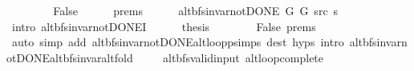 \begin{isabellebody}
\ \ \isamarkupfalse%
\isanewline
\ \ \ \ \isamarkupfalse%
\ False\isanewline
\ \ \ \ \isamarkupfalse%
\ {\isachardoublequoteopen}{}{\isachardot}{\kern0pt}prems{\isachardoublequoteclose}{\isacharparenleft}{\kern0pt}{}{\isacharparenright}{\kern0pt}\isanewline
\ \ \ \ \isamarkupfalse%
\ {\isachardoublequoteopen}alt{\isacharunderscore}{\kern0pt}bfs{\isacharunderscore}{\kern0pt}invar{\isacharunderscore}{\kern0pt}not{\isacharunderscore}{\kern0pt}DONE{\isacharprime}{\kern0pt}\ G{}\ G{}\ src\ s{\isachardoublequoteclose}\isanewline
\ \ \ \ \ \ \isamarkupfalse%
\ {\isacharparenleft}{\kern0pt}intro\ alt{\isacharunderscore}{\kern0pt}bfs{\isacharunderscore}{\kern0pt}invar{\isacharunderscore}{\kern0pt}not{\isacharunderscore}{\kern0pt}DONE{\isacharprime}{\kern0pt}I{\isacharparenright}{\kern0pt}\isanewline
\ \ \ \ \isamarkupfalse%
\ {\isacharquery}{\kern0pt}thesis\isanewline
\ \ \ \ \ \ \isamarkupfalse%
\ False\ {\isachardoublequoteopen}{}{\isachardot}{\kern0pt}prems{\isachardoublequoteclose}{\isacharparenleft}{\kern0pt}{}{\isacharparenright}{\kern0pt}\isanewline
\ \ \ \ \ \ \isamarkupfalse%
\ {\isacharparenleft}{\kern0pt}auto\ simp\ add{\isacharcolon}{\kern0pt}\ alt{\isacharunderscore}{\kern0pt}bfs{\isacharunderscore}{\kern0pt}invar{\isacharunderscore}{\kern0pt}not{\isacharunderscore}{\kern0pt}DONE{\isachardot}{\kern0pt}alt{\isacharunderscore}{\kern0pt}loop{\isacharunderscore}{\kern0pt}psimps\ dest{\isacharcolon}{\kern0pt}\ {\isachardoublequoteopen}{}{\isachardot}{\kern0pt}hyps{\isachardoublequoteclose}\ intro{\isacharcolon}{\kern0pt}\ alt{\isacharunderscore}{\kern0pt}bfs{\isacharunderscore}{\kern0pt}invar{\isacharunderscore}{\kern0pt}not{\isacharunderscore}{\kern0pt}DONE{\isachardot}{\kern0pt}alt{\isacharunderscore}{\kern0pt}bfs{\isacharunderscore}{\kern0pt}invar{\isacharunderscore}{\kern0pt}alt{\isacharunderscore}{\kern0pt}fold{\isacharparenright}{\kern0pt}\isanewline
\ \ \isamarkupfalse%
\isanewline
{}\isamarkupfalse%
%
\endisatagproof
{\isafoldproof}%
%
\isadelimproof
\isanewline
%
\endisadelimproof
\isanewline
{}\isamarkupfalse%
\ {\isacharparenleft}{\kern0pt}\ alt{\isacharunderscore}{\kern0pt}bfs{\isacharunderscore}{\kern0pt}valid{\isacharunderscore}{\kern0pt}input{\isacharparenright}{\kern0pt}\ alt{\isacharunderscore}{\kern0pt}loop{\isacharunderscore}{\kern0pt}complete{\isacharcolon}{\kern0pt}\isanewline

\end{isabellebody}
